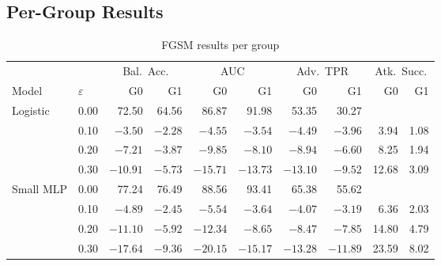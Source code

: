 \documentclass[11pt]{article}
\begin{document}
\subsection*{Per-Group Results}

\begin{table}[H]
\centering
\caption{FGSM results per group}
\label{tab:fgsm-by-group}
\setlength{\tabcolsep}{4pt}
\begin{tabular}{ll rr rr rr rr}
\toprule
 & & \multicolumn{2}{c}{Bal.\ Acc.} & \multicolumn{2}{c}{AUC}
   & \multicolumn{2}{c}{Adv.\ TPR} & \multicolumn{2}{c}{Atk.\ Succ.} \\
\cmidrule(lr){3-4}\cmidrule(lr){5-6}\cmidrule(lr){7-8}\cmidrule(lr){9-10}
Model & $\varepsilon$ & G0 & G1 & G0 & G1 & G0 & G1 & G0 & G1 \\
\midrule
\multirow{4}{*}{Logistic}
 & 0.00 & 72.50 & 64.56 & 86.87 & 91.98 & 53.35 & 30.27 & & \\
 & 0.10 & $-3.50$ & $-2.28$ & $-4.55$ & $-3.54$ & $-4.49$ & $-3.96$ & 3.94 & 1.08 \\
 & 0.20 & $-7.21$ & $-3.87$ & $-9.85$ & $-8.10$ & $-8.94$ & $-6.60$ & 8.25 & 1.94 \\
 & 0.30 & $-10.91$ & $-5.73$ & $-15.71$ & $-13.73$ & $-13.10$ & $-9.52$ & 12.68 & 3.09 \\
\midrule
\multirow{4}{*}{Small MLP}
 & 0.00 & 77.24 & 76.49 & 88.56 & 93.41 & 65.38 & 55.62 & & \\
 & 0.10 & $-4.89$ & $-2.45$ & $-5.54$ & $-3.64$ & $-4.07$ & $-3.19$ & 6.36 & 2.03 \\
 & 0.20 & $-11.10$ & $-5.92$ & $-12.34$ & $-8.65$ & $-8.47$ & $-7.85$ & 14.80 & 4.79 \\
 & 0.30 & $-17.64$ & $-9.36$ & $-20.15$ & $-15.17$ & $-13.28$ & $-11.89$ & 23.59 & 8.02 \\
\bottomrule
\end{tabular}
\end{table}
\end{document}
